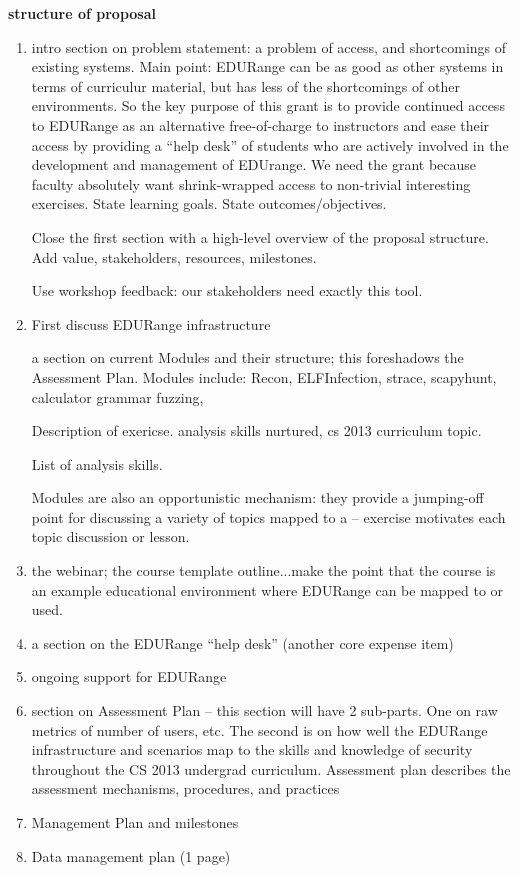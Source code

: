 
{\bf structure of proposal}

\begin{enumerate}

 \item intro section on problem statement: a problem of access, and
   shortcomings of existing systems. Main point: EDURange can be as
   good as other systems in terms of curriculur material, but has less
   of the shortcomings of other environments. So the key purpose of
   this grant is to provide continued access to EDURange {as an
     alternative} free-of-charge to instructors {and} ease their
   access by providing a ``help desk'' of students who are actively
   involved in the development and management of EDUrange. We need the
   grant because faculty absolutely want shrink-wrapped access to
   non-trivial interesting exercises. State learning goals. State outcomes/objectives.

   Close the first section with a high-level overview of the proposal
   structure. Add value, stakeholders, resources, milestones.

   Use workshop feedback: our stakeholders need exactly this tool.

 \item 
 
   First discuss EDURange infrastructure

   a section on current Modules and their structure; this
   foreshadows the Assessment Plan. Modules include: Recon,
   ELFInfection, strace, scapyhunt, calculator grammar fuzzing,

   Description of exericse. analysis skills nurtured, cs 2013 curriculum topic.
   
   List of analysis skills.

   Modules are also an opportunistic mechanism: they provide a
   jumping-off point for discussing a variety of topics mapped to
   a -- exercise motivates each topic discussion or lesson.


 \item the webinar; the course template outline...make the point that
   the course is an example educational environment where EDURange can
   be mapped to or used.

 \item a section on the EDURange ``help desk'' (another core expense
   item)

 \item ongoing support for EDURange

 \item section on Assessment Plan -- this section will have 2
   sub-parts. One on raw metrics of number of users, etc. The second
   is on how well the EDURange infrastructure and scenarios map to the
   skills and knowledge of security throughout the CS 2013 undergrad
   curriculum. Assessment plan describes the assessment mechanisms,
   procedures, and practices

 \item Management Plan and milestones

 \item Data management plan (1 page)

\end{enumerate}
